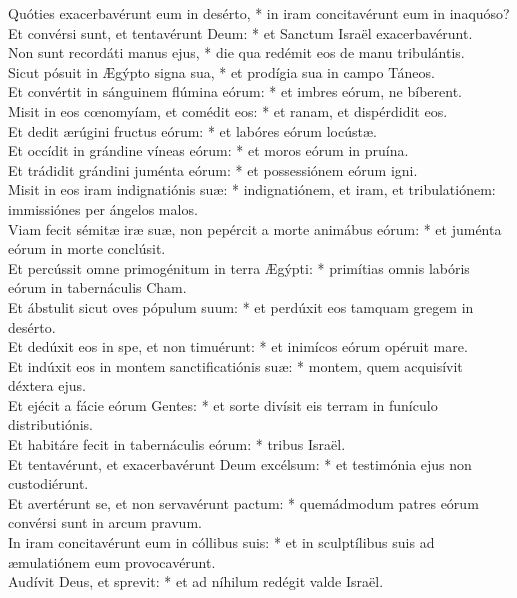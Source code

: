 {	Quóties exacerbavérunt eum in desérto, * in iram concitavérunt eum in inaquóso? \\
	Et convérsi sunt, et tentavérunt Deum: * et Sanctum Israël exacerbavérunt. \\
	Non sunt recordáti manus ejus, * die qua redémit eos de manu tribulántis. \\
	Sicut pósuit in Ægýpto signa sua, * et prodígia sua in campo Táneos. \\
	Et convértit in sánguinem flúmina eórum: * et imbres eórum, ne bíberent. \\
	Misit in eos cœnomyíam, et comédit eos: * et ranam, et dispérdidit eos. \\
	Et dedit ærúgini fructus eórum: * et labóres eórum locústæ. \\
	Et occídit in grándine víneas eórum: * et moros eórum in pruína. \\
	Et trádidit grándini juménta eórum: * et possessiónem eórum igni. \\
	Misit in eos iram indignatiónis suæ: * indignatiónem, et iram, et tribulatiónem: immissiónes per ángelos malos. \\
	Viam fecit sémitæ iræ suæ, non pepércit a morte animábus eórum: * et juménta eórum in morte conclúsit. \\
	Et percússit omne primogénitum in terra Ægýpti: * primítias omnis labóris eórum in tabernáculis Cham. \\
	Et ábstulit sicut oves pópulum suum: * et perdúxit eos tamquam gregem in desérto. \\
	Et dedúxit eos in spe, et non timuérunt: * et inimícos eórum opéruit mare. \\
	Et indúxit eos in montem sanctificatiónis suæ: * montem, quem acquisívit déxtera ejus. \\
	Et ejécit a fácie eórum Gentes: * et sorte divísit eis terram in funículo distributiónis. \\
	Et habitáre fecit in tabernáculis eórum: * tribus Israël. \\
	Et tentavérunt, et exacerbavérunt Deum excélsum: * et testimónia ejus non custodiérunt. \\
	Et avertérunt se, et non servavérunt pactum: * quemádmodum patres eórum convérsi sunt in arcum pravum. \\
	In iram concitavérunt eum in cóllibus suis: * et in sculptílibus suis ad æmulatiónem eum provocavérunt. \\
	Audívit Deus, et sprevit: * et ad níhilum redégit valde Israël. \\
}
